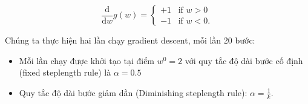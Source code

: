 \documentclass{book}
\begin{document}
\begin{equation*}
    \frac{\mathrm{d}}{\mathrm{d}w}g(w) = \begin{cases}
    +1 \,\,\,\,\,\text{if} \,\, w > 0 \\
    -1 \,\,\,\,\,\text{if} \,\, w < 0.
    \end{cases}
\end{equation*}

Chúng ta thực hiện hai lần chạy gradient descent, mỗi lần 20 bước:
\begin{itemize}
    \item Mỗi lần chạy được khởi tạo tại điểm $w^0=2$ với quy tắc độ dài bước cố định (fixed steplength rule) là $\alpha=0.5$
    \item Quy tắc độ dài bước giảm dần (Diminishing steplength rule): $\alpha = \frac{1}{k}$.
\end{itemize}
\end{document}
